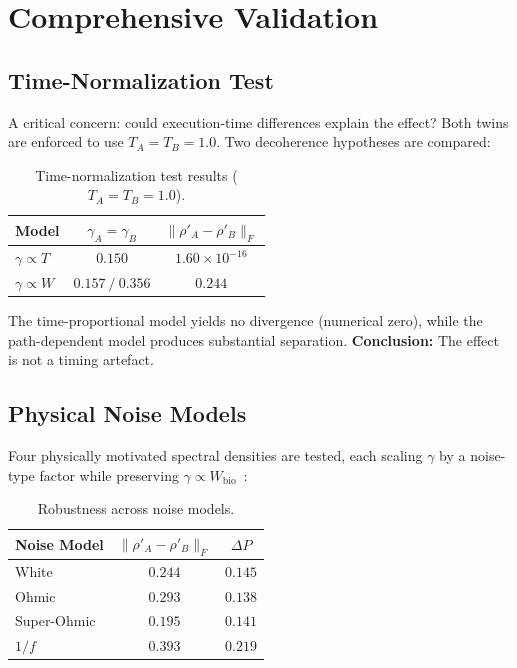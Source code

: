 \documentclass[12pt,a4paper]{article}
\begin{document}
\section{Comprehensive Validation}

\subsection{Time-Normalization Test}

A critical concern: could execution-time differences explain the effect?
Both twins are enforced to use $T_A = T_B = 1.0$.
Two decoherence hypotheses are compared:

\begin{table}[htbp]
\centering
\caption{Time-normalization test results ($T_A = T_B = 1.0$).}
\label{tab:time_norm}
\begin{tabular}{lcc}
\toprule
Model & $\gamma_A = \gamma_B$ & $\|\rho'_A - \rho'_B\|_F$ \\
\midrule
$\gamma \propto T$ & $0.150$ & $1.60\times 10^{-16}$ \\
$\gamma \propto W$ & $0.157\ /\ 0.356$ & $\mathbf{0.244}$ \\
\bottomrule
\end{tabular}
\end{table}

The time-proportional model yields no divergence (numerical zero),
while the path-dependent model produces substantial separation.
\textbf{Conclusion:} The effect is not a timing artefact.

\subsection{Physical Noise Models}

Four physically motivated spectral densities are tested, each scaling
$\gamma$ by a noise-type factor while preserving
$\gamma \propto W_{\mathrm{bio}}$~\citep{weiss2012quantum}:

\begin{table}[htbp]
\centering
\caption{Robustness across noise models.}
\label{tab:noise}
\begin{tabular}{lcc}
\toprule
Noise Model & $\|\rho'_A - \rho'_B\|_F$ & $\Delta P$ \\
\midrule
White      & $0.244$ & $0.145$ \\
Ohmic      & $0.293$ & $0.138$ \\
Super-Ohmic & $0.195$ & $0.141$ \\
$1/f$      & $0.393$ & $0.219$ \\
\bottomrule
\end{tabular}
\end{table}
\end{document}
